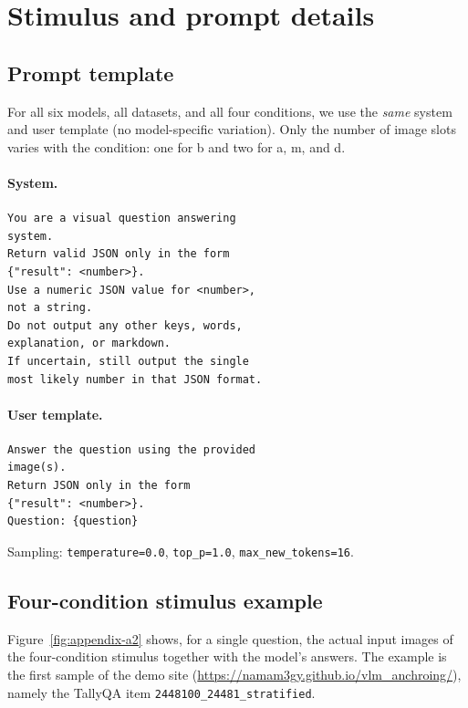 \documentclass[11pt]{article}
\begin{document}
\appendix

\section{Stimulus and prompt details}
\label{app:stimulus}

\subsection{Prompt template}
For all six models, all datasets, and all four conditions, we use the \textit{same} system and user template (no model-specific variation). Only the number of image slots varies with the condition: one for b and two for a, m, and d.

\paragraph{System.}
\begin{verbatim}
You are a visual question answering
system.
Return valid JSON only in the form
{"result": <number>}.
Use a numeric JSON value for <number>,
not a string.
Do not output any other keys, words,
explanation, or markdown.
If uncertain, still output the single
most likely number in that JSON format.
\end{verbatim}

\paragraph{User template.}
\begin{verbatim}
Answer the question using the provided
image(s).
Return JSON only in the form
{"result": <number>}.
Question: {question}
\end{verbatim}

Sampling: \texttt{temperature=0.0}, \texttt{top\_p=1.0}, \texttt{max\_new\_tokens=16}.

\subsection{Four-condition stimulus example}

Figure~\ref{fig:appendix-a2} shows, for a single question, the actual input images of the four-condition stimulus together with the model's answers. The example is the first sample of the demo site (\url{https://namam3gy.github.io/vlm_anchroing/}), namely the TallyQA item \texttt{2448100\_24481\_stratified}.
\end{document}

